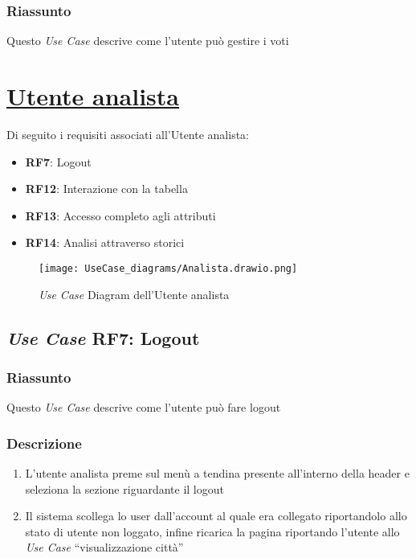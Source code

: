         \subsubsection{Riassunto}
            Questo \textit{Use Case} descrive come l'utente può gestire i voti


\section{\underline{Utente analista}}
    Di seguito i requisiti associati all'Utente analista:
    \begin{itemize}
        \item \textbf{RF7}: Logout
        \item \textbf{RF12}: Interazione con la tabella
        \item \textbf{RF13}: Accesso completo agli attributi
        \item \textbf{RF14}: Analisi attraverso storici
    \end{itemize}
    \begin{figure}[H]
        \centering
        \texttt{[image: UseCase\_diagrams/Analista.drawio.png]}
        \caption{\textit{Use Case} Diagram dell'Utente analista}
    \end{figure}

    \subsection{\textit{Use Case} RF7: Logout}
        \subsubsection{Riassunto}
            Questo \textit{Use Case} descrive come l'utente può fare logout
        \subsubsection{Descrizione}
            \begin{enumerate}
                \item L'utente analista preme sul menù a tendina presente all'interno della header e seleziona la sezione riguardante il logout
                \item Il sistema scollega lo user dall'account al quale era collegato riportandolo allo stato di utente non loggato, infine 
                ricarica la pagina riportando l'utente allo \textit{Use Case} ``visualizzazione città''
            \end{enumerate}

